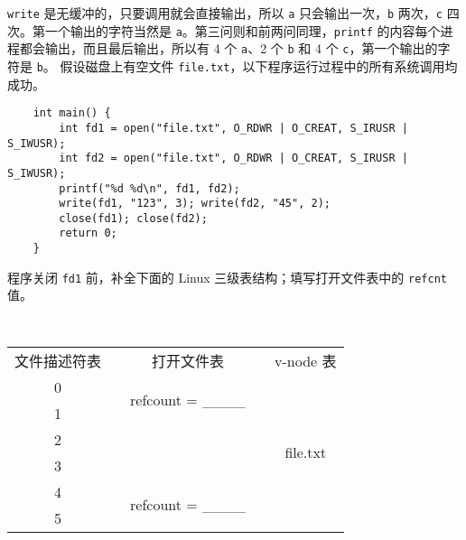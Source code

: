 \begin{problems}
        \verb|write| 是无缓冲的，只要调用就会直接输出，所以 \verb|a| 只会输出一次，\verb|b| 两次，\verb|c| 四次。第一个输出的字符当然是 \verb|a|。第三问则和前两问同理，\verb|printf| 的内容每个进程都会输出，而且最后输出，所以有 4 个 \verb|a|、2 个 \verb|b| 和 4 个 \verb|c|，第一个输出的字符是 \verb|b|。
        \pro 假设磁盘上有空文件 \verb|file.txt|，以下程序运行过程中的所有系统调用均成功。
        \begin{verbatim}
    int main() {
        int fd1 = open("file.txt", O_RDWR | O_CREAT, S_IRUSR | S_IWUSR); 
        int fd2 = open("file.txt", O_RDWR | O_CREAT, S_IRUSR | S_IWUSR); 
        printf("%d %d\n", fd1, fd2);
        write(fd1, "123", 3); write(fd2, "45", 2);
        close(fd1); close(fd2);
        return 0;
    }
        \end{verbatim}
        \qn 程序关闭 \verb|fd1| 前，补全下面的 Linux 三级表结构；填写打开文件表中的 \verb|refcnt| 值。
        \begin{table}[H]
            \tt
            \centering
            \begin{tabular}{ccccc}
                文件描述符表 & {\qquad \qquad \qquad} & 打开文件表 & {\qquad \qquad \qquad} & v-node 表 \\ \cline{1-1} \cline{3-3} \cline{5-5} 
                \multicolumn{1}{|c|}{0} & \multicolumn{1}{c|}{} & \multicolumn{1}{c|}{\multirow{2}{*}{refcount = \_\_\_\_}} & \multicolumn{1}{c|}{} & \multicolumn{1}{c|}{\multirow{6}{*}{file.txt}} \\ \cline{1-1}
                \multicolumn{1}{|c|}{1} & \multicolumn{1}{c|}{} & \multicolumn{1}{c|}{} & \multicolumn{1}{c|}{} & \multicolumn{1}{c|}{} \\ \cline{1-1} \cline{3-3}
                \multicolumn{1}{|c|}{2} &  &  & \multicolumn{1}{c|}{} & \multicolumn{1}{c|}{} \\ \cline{1-1}
                \multicolumn{1}{|c|}{3} &  &  & \multicolumn{1}{c|}{} & \multicolumn{1}{c|}{} \\ \cline{1-1} \cline{3-3}
                \multicolumn{1}{|c|}{4} & \multicolumn{1}{c|}{} & \multicolumn{1}{c|}{\multirow{2}{*}{refcount = \_\_\_\_}} & \multicolumn{1}{c|}{} & \multicolumn{1}{c|}{} \\ \cline{1-1}
                \multicolumn{1}{|c|}{5} & \multicolumn{1}{c|}{} & \multicolumn{1}{c|}{} & \multicolumn{1}{c|}{} & \multicolumn{1}{c|}{} \\ \cline{1-1} \cline{3-3} \cline{5-5} 
            \end{tabular}

\end{table}
\end{problems}

